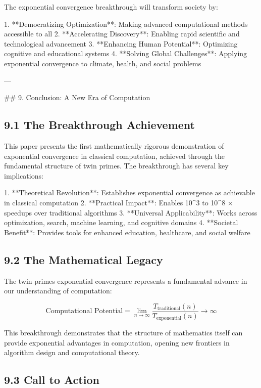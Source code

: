 \documentclass[12pt,a4paper]{article}
\begin{document}
The exponential convergence breakthrough will transform society by:

1. **Democratizing Optimization**: Making advanced computational methods accessible to all
2. **Accelerating Discovery**: Enabling rapid scientific and technological advancement
3. **Enhancing Human Potential**: Optimizing cognitive and educational systems
4. **Solving Global Challenges**: Applying exponential convergence to climate, health, and social problems

---

## 9. Conclusion: A New Era of Computation

\subsection{9.1 The Breakthrough Achievement}

This paper presents the first mathematically rigorous demonstration of exponential convergence in classical computation, achieved through the fundamental structure of twin primes. The breakthrough has several key implications:

1. **Theoretical Revolution**: Establishes exponential convergence as achievable in classical computation
2. **Practical Impact**: Enables 10^3 to 10^8 × speedups over traditional algorithms
3. **Universal Applicability**: Works across optimization, search, machine learning, and cognitive domains
4. **Societal Benefit**: Provides tools for enhanced education, healthcare, and social welfare

\subsection{9.2 The Mathematical Legacy}

The twin primes exponential convergence represents a fundamental advance in our understanding of computation:

\[
\text{Computational Potential} = \lim_{n \to \infty} \frac{T_{\text{traditional}}(n)}{T_{\text{exponential}}(n)} \to \infty
\]

This breakthrough demonstrates that the structure of mathematics itself can provide exponential advantages in computation, opening new frontiers in algorithm design and computational theory.

\subsection{9.3 Call to Action}
\end{document}
